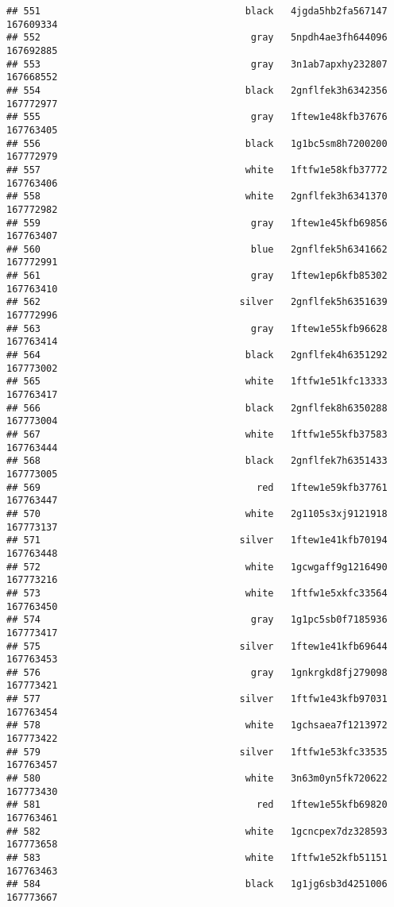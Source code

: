 \documentclass[
]{article}
\begin{document}
\begin{verbatim}
## 551                                    black   4jgda5hb2fa567147 167609334
## 552                                     gray   5npdh4ae3fh644096 167692885
## 553                                     gray   3n1ab7apxhy232807 167668552
## 554                                    black   2gnflfek3h6342356 167772977
## 555                                     gray   1ftew1e48kfb37676 167763405
## 556                                    black   1g1bc5sm8h7200200 167772979
## 557                                    white   1ftfw1e58kfb37772 167763406
## 558                                    white   2gnflfek3h6341370 167772982
## 559                                     gray   1ftew1e45kfb69856 167763407
## 560                                     blue   2gnflfek5h6341662 167772991
## 561                                     gray   1ftew1ep6kfb85302 167763410
## 562                                   silver   2gnflfek5h6351639 167772996
## 563                                     gray   1ftew1e55kfb96628 167763414
## 564                                    black   2gnflfek4h6351292 167773002
## 565                                    white   1ftfw1e51kfc13333 167763417
## 566                                    black   2gnflfek8h6350288 167773004
## 567                                    white   1ftfw1e55kfb37583 167763444
## 568                                    black   2gnflfek7h6351433 167773005
## 569                                      red   1ftew1e59kfb37761 167763447
## 570                                    white   2g1105s3xj9121918 167773137
## 571                                   silver   1ftew1e41kfb70194 167763448
## 572                                    white   1gcwgaff9g1216490 167773216
## 573                                    white   1ftfw1e5xkfc33564 167763450
## 574                                     gray   1g1pc5sb0f7185936 167773417
## 575                                   silver   1ftew1e41kfb69644 167763453
## 576                                     gray   1gnkrgkd8fj279098 167773421
## 577                                   silver   1ftfw1e43kfb97031 167763454
## 578                                    white   1gchsaea7f1213972 167773422
## 579                                   silver   1ftfw1e53kfc33535 167763457
## 580                                    white   3n63m0yn5fk720622 167773430
## 581                                      red   1ftew1e55kfb69820 167763461
## 582                                    white   1gcncpex7dz328593 167773658
## 583                                    white   1ftfw1e52kfb51151 167763463
## 584                                    black   1g1jg6sb3d4251006 167773667

\end{verbatim}
\end{document}
